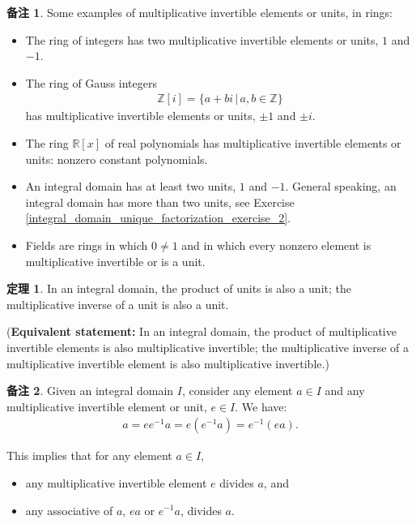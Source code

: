 \documentclass[utf8]{ctexbook}
\theoremstyle{definition}
\newtheorem{prototheorem}{定理}[section]
\newenvironment{theorem}
   {\colorlet{shadecolor}{red!30}\begin{shaded}\begin{prototheorem}}
   {\end{prototheorem}\end{shaded}}
\newtheorem{memo}{备注}[section]
\begin{document}
\begin{memo}
Some examples of multiplicative invertible elements or units, in rings:
\begin{itemize}
\item{The ring of integers has two multiplicative invertible elements or units, $1$ and $-1$.}
\item{The ring of Gauss integers
\begin{align*}
\mathbb{Z}[i] = \{ a + bi \, | \, a, b \in \mathbb{Z} \}
\end{align*}
has multiplicative invertible elements or units, $\pm 1$ and $\pm i$.
}
\item{The ring $\mathbb{R}[x]$ of real polynomials has multiplicative invertible elements or units: nonzero constant polynomials.}
\item{An integral domain has at least two units, $1$ and $-1$. General speaking, an integral domain has more than two units, see Exercise \ref{integral_domain_unique_factorization_exercise_2}.}
\item{Fields are rings in which $0 \neq 1$ and in which every nonzero element is multiplicative invertible or is a unit.}
\end{itemize}
\end{memo}

\begin{theorem}\label{thm_integral_domain_unit_product_inverse}
In an integral domain, the product of units is also a unit; the multiplicative inverse of a unit is also a unit.

(\textbf{Equivalent statement:} In an integral domain, the product of multiplicative invertible elements is also multiplicative invertible; the multiplicative inverse of a multiplicative invertible element is also multiplicative invertible.)
\end{theorem}

\begin{memo}
Given an integral domain $I$, consider any element $a \in I$ and any multiplicative invertible element or unit, $e \in I$. We have:
\begin{align*}
a = e e^{-1} a = e (e^{-1} a ) =  e^{-1} (e a) .
\end{align*}

This implies that for any element $a \in I $, 
\begin{itemize}
\item{any multiplicative invertible element $e$ divides $a$, and}
\item{any associative of $a$, $e a$ or $e^{-1} a$, divides $a$. }
\end{itemize}

\end{memo}
\end{document}
